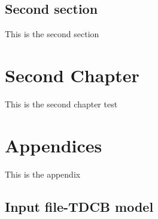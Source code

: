\documentclass{icldt}
\begin{document}
\section{Second section}
This is the second section

\chapter{Second Chapter}
This is the second chapter test


\FloatBarrier
\newpage
\appendix
\chapter{Appendices}
This is the appendix
\section{Input file-TDCB model}

\end{document}
